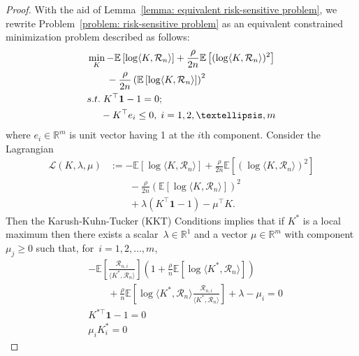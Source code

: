 \documentclass[letterpaper, 10 pt, journal, twoside]{IEEEtran}  %
\begin{document}
\begin{proof}
  With the aid of Lemma~\ref{lemma: equivalent risk-sensitive problem},  we rewrite Problem~\eqref{problem: risk-sensitive problem} as an equivalent constrained minimization problem described as follows:
    \begin{align*}
        &\min_{K} -\mathbb{E}\left[ \log \langle K, \mathcal{R}_n \rangle \right] + \frac{\rho}{2n} \mathbb{E}\left[ (\log \langle K, \mathcal{R}_n \rangle )^2 \right] \\
        &\qquad   -\frac{\rho}{2n}\left( \mathbb{E}\left[ \log \langle K, \mathcal{R}_n \rangle \right]\right)^2 \\
        &{\rm s. t.} \; K^\top  \mathbf{1} - 1 = 0; \\
        &\;\;\;\;\; -K^\top  e_i \leq 0, \; i=1,2, \ldots, m
    \end{align*}
    where $ e_i \in \mathbb{R}^m $ is unit vector having 1 at the $i$th component. Consider the Lagrangian
    \begin{align*}
        \mathcal{L}(K, \lambda, \mu)
        &:= -\mathbb{E}\left[ \log \langle K, \mathcal{R}_n \rangle \right] + \frac{\rho}{2n} \mathbb{E} \left[ ( \log \langle K, \mathcal{R}_n \rangle)^2 \right] \\
        &\qquad -\frac{\rho}{2n}\left( \mathbb{E}\left[ \log \langle K, \mathcal{R}_n \rangle \right] \right)^2 \\ & \qquad + \lambda (K^\top  \mathbf{1} - 1) - \mu^\top K.
    \end{align*}
Then the Karush-Kuhn-Tucker (KKT) Conditions implies that if $K^*$ is a local maximum then there exists a scalar~$\lambda \in \mathbb{R}^1$ and a vector $\mu \in \mathbb{R}^m$ with component $\mu_j \geq 0$ such that, for~$i=1,2, \ldots, m$,
    \begin{align}
        &-\mathbb{E}\left[ \frac{\mathcal{R}_{n,i}}{ \langle K^{*}, \mathcal{R}_n \rangle} \right] \left( 1 + \frac{\rho}{n}\mathbb{E}\left[ \log \langle K^{*}, \mathcal{R}_n \rangle \right] \right) \nonumber \\
        &\qquad + \frac{\rho}{n}\mathbb{E}\left[ \log \langle K^{*}, \mathcal{R}_n \rangle \frac{\mathcal{R}_{n,i}}{\langle K^{*}, \mathcal{R}_n \rangle }  \right] +\lambda - \mu_i = 0 \label{eq:partial Ki (risk)} \\
        & K^{*\top} \mathbf{1} - 1 = 0 \label{eq: partical lambda (risk)} \\
        & \mu_i K_i^* = 0 \label{eq: Mu_i x Ki* = 0 (risk)}
    \end{align}

\end{proof}
\end{document}
